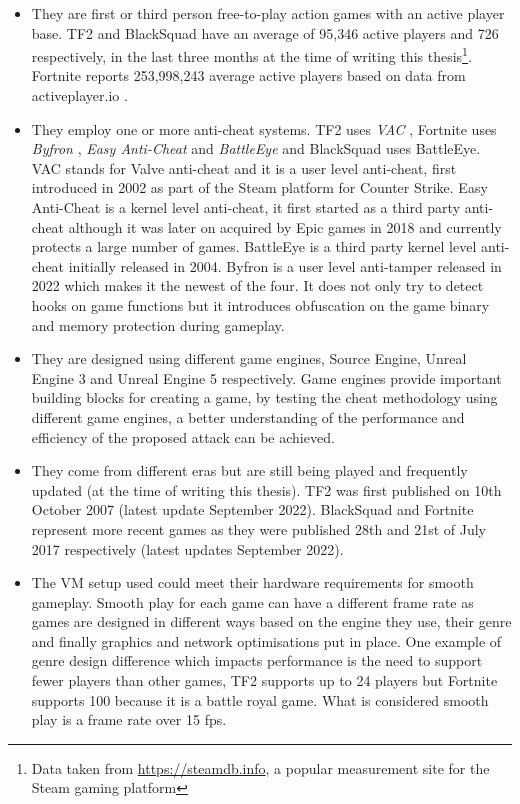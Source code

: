 \begin{itemize}
    \item They are first or third person free-to-play action games with an active player base. TF2 and BlackSquad have an average of 95,346 active players and 726 respectively, in the last three months at the time of writing this thesis\footnote{Data taken from \url{https://steamdb.info}, a popular measurement site for the Steam gaming platform}. Fortnite reports 253,998,243 average active players based on data from activeplayer.io \cite{fortniteStats}.
    \item They employ one or more anti-cheat systems. TF2 uses \emph{VAC} \cite{VAC}, Fortnite uses \emph{Byfron} \cite{byfron}, \emph{Easy Anti-Cheat} \cite{EAC} and \emph{BattleEye} \cite{battleEye} and BlackSquad uses BattleEye. VAC stands for Valve anti-cheat and it is a user level anti-cheat, first introduced in 2002 as part of the Steam platform for Counter Strike. Easy Anti-Cheat is a kernel level anti-cheat, it first started as a third party anti-cheat although it was later on acquired by Epic games in 2018 and currently protects a large number of games. BattleEye is a third party kernel level anti-cheat initially released in 2004. Byfron is a user level anti-tamper released in 2022 which makes it the newest of the four. It does not only try to detect hooks on game functions but it introduces obfuscation on the game binary and memory protection during gameplay.
    
    \item They are designed using different game engines, Source Engine, Unreal Engine 3 and Unreal Engine 5 respectively. Game engines provide important building blocks for creating a game, by testing the cheat methodology using different game engines, a better understanding of the performance and efficiency of the proposed attack can be achieved.
    \item They come from different eras but are still being played and frequently updated (at the time of writing this thesis). TF2 was first published on 10th October 2007 (latest update September 2022). BlackSquad and Fortnite represent more recent games as they were published 28th and 21st of July 2017 respectively (latest updates September 2022).
    \item The VM setup used could meet their hardware requirements for smooth gameplay. Smooth play for each game can have a different frame rate as games are designed in different ways based on the engine they use, their genre and finally graphics and network optimisations put in place. One example of genre design difference which impacts performance is the need to support fewer players than other games, TF2 supports up to 24 players but Fortnite supports 100 because it is a battle royal game. What is considered smooth play is a frame rate over 15 fps.
\end{itemize} 


